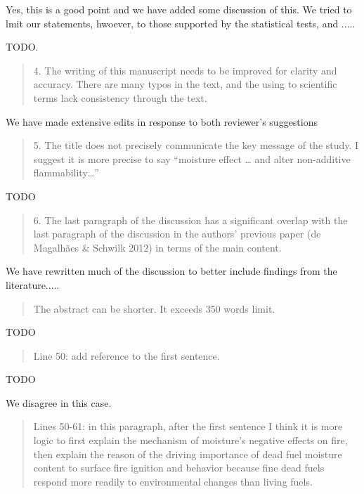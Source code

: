 \documentclass[letterpaper, 12pt]{letter}
\begin{document}
\begin{letter}{}
Yes, this is a good point and we have added some discussion of this.  We tried to lmit our statements, hwoever, to those supported by the statistical tests, and .....

TODO.

\begin{quote}
4. The writing of this manuscript needs to be improved for clarity and accuracy. There are many typos in the text, and the using to scientific terms lack consistency through the text.
\end{quote}

We have made extensive edits in response to both reviewer's suggestions

\begin{quote}
5. The title does not precisely communicate the key message of the study. I suggest it is more precise to say “moisture effect … and alter non-additive flammability…”
\end{quote}

TODO

\begin{quote}
6. The last paragraph of the discussion has a significant overlap with the last paragraph of the discussion in the authors’ previous paper (de Magalhães \& Schwilk 2012) in terms of the main content.
\end{quote}

We have rewritten much of the discussion to better include findings from the literature.....

\begin{quote}
The abstract can be shorter. It exceeds 350 words limit. 
\end{quote}

TODO

\begin{quote}
Line 50: add reference to the first sentence.
\end{quote}

TODO

We disagree in this case. 

\begin{quote}
Lines 50-61: in this paragraph, after the first sentence I think it is more logic to first explain the mechanism of moisture’s negative effects on fire, then explain the reason of the driving importance of dead fuel moisture content to surface fire ignition and behavior because fine dead fuels respond more readily to environmental changes than living fuels.
\end{quote}


\end{letter}
\end{document}
